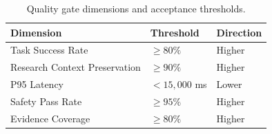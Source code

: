 \begin{table}[htbp]
\renewcommand{\arraystretch}{1.1}
\centering
\small
\setlength{\tabcolsep}{3pt}
\caption{Quality gate dimensions and acceptance thresholds.}
\label{tab:quality_thresholds}
\begin{tabular}{p{2.3cm}p{1.8cm}p{1.6cm}}
\toprule
\textbf{Dimension} & \textbf{Threshold} & \textbf{Direction} \\
\midrule
Task Success Rate & $\geq 80\%$ & Higher \\
Research Context Preservation & $\geq 90\%$ & Higher \\
P95 Latency & $< 15{,}000$ ms & Lower \\
Safety Pass Rate & $\geq 95\%$ & Higher \\
Evidence Coverage & $\geq 80\%$ & Higher \\
\bottomrule
\end{tabular}
\setlength{\tabcolsep}{6pt}
\end{table}
